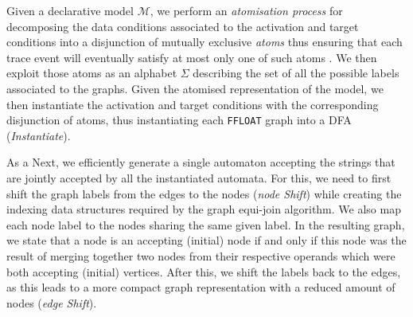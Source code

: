 \documentclass[sigconf]{acmart}
\begin{document}
Given a declarative model $\mathcal{M}$, %
we %
perform an \textit{atomisation process} for %
decomposing the data conditions associated to the activation and target conditions into a disjunction of mutually exclusive \textit{atoms} thus ensuring that each trace event will eventually satisfy at most only one of such atoms  \cite{DBLP:conf/bpm/BergamiMMM21}. We then exploit those atoms as an alphabet $\Sigma$ describing the set of all the possible labels associated to the graphs. %
Given the atomised representation of the model, we then instantiate the activation and target conditions with the corresponding disjunction of atoms, thus instantiating each \texttt{FFLOAT} graph into a DFA (\textit{Instantiate}). 


As a 
Next, %
we %
efficiently generate a single automaton accepting the strings that are jointly accepted by all the instantiated automata. For this, we need to first shift the graph labels from the edges to the nodes (\textit{node Shift}) while creating the indexing data structures required by the graph equi-join algorithm. We also map each node label to the nodes sharing the same given label. In the resulting graph, we state that a node is an accepting (initial) node if and only if this node was the result of merging together two nodes from their respective operands which were both accepting (initial) vertices. After this, we shift the labels back to the edges, as this leads to a more compact graph representation with a reduced amount of nodes (\textit{edge Shift}).

%


\end{document}
